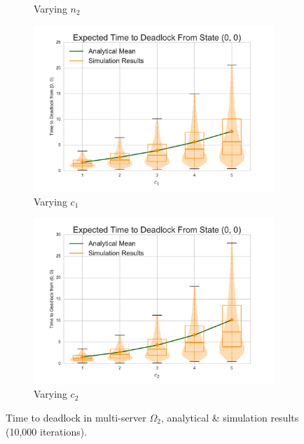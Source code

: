 \documentclass{article}
\numberwithin{equation}{section}
\begin{document}
\begin{figure}[!htbp]
\begin{center}
\begin{subfigure}[b]{0.34\textwidth}
    \caption{Varying $n_2$}
    \label{fig:2Nms_n2}
  \end{subfigure}
  \begin{subfigure}[b]{0.34\textwidth}
    \includegraphics[width=\textwidth]{images/varyc1_2Nms}
    \caption{Varying $c_1$}
    \label{fig:2Nms_c1}
  \end{subfigure}
  \begin{subfigure}[b]{0.34\textwidth}
    \includegraphics[width=\textwidth]{images/varyc2_2Nms}
    \caption{Varying $c_2$}
    \label{fig:2Nms_c2}
  \end{subfigure}
  \end{center}
  \caption{Time to deadlock in multi-server $\Omega_2$, analytical \& simulation results (10,000 iterations).}
  \label{fig:timestodeadlock2nodemultiserver}
\end{figure}
\end{document}
